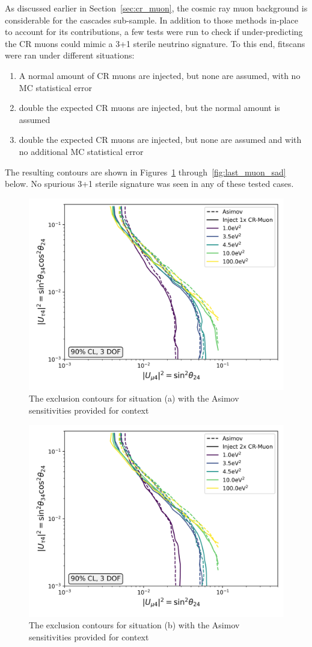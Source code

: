 \documentclass[main.tex]{subfiles}
\begin{document}
As discussed earlier in Section~\ref{sec:cr_muon}, the cosmic ray muon background is considerable for the cascades sub-sample. 
In addition to those methods in-place to account for its contributions, a few tests were run to check if under-predicting the CR muons could mimic a 3+1 sterile neutrino signature. 
To this end, fitscans were ran under different situations:
\begin{enumerate}[label=(\alph*)]
    \item A normal amount of CR muons are injected, but none are assumed, with no MC statistical error 
    \item double the expected CR muons are injected, but the normal amount is assumed 
    \item double the expected CR muons are injected, but none are assumed and with no additional MC statistical error 
\end{enumerate}
The resulting contours are shown in Figures~\ref{fig:first_muon_sad} through~\ref{fig:last_muon_sad} below. 
No spurious 3+1 sterile signature was seen in any of these tested cases.

\begin{figure}
    \centering
    \includegraphics[width=0.7\linewidth]{figures/double_muon_mismodel_worse_Realization_Asimov_sterile_0_cl0.9_dof3.png}
    \caption{The exclusion contours for situation (a) with the Asimov sensitivities provided for context}\label{fig:first_muon_sad}
\end{figure}  


\begin{figure}
    \centering
    \includegraphics[width=0.7\linewidth]{figures/double_muon_mismodel_Realization_doublcr_sterile_0_cl0.9_dof3.png}
    \caption{The exclusion contours for situation (b) with the Asimov sensitivities provided for context}
\end{figure}   
\end{document}
